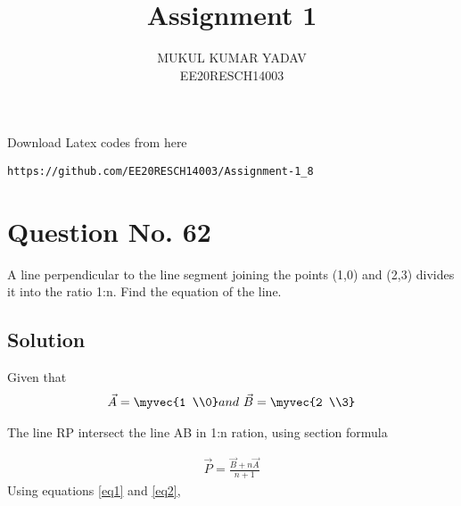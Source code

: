 \documentclass[journal,12pt,twocolumn]{IEEEtran}
\begin{document}
     \def\rightbox#1{\makebox[0in][r]{#1}}
     \def\centbox#1{\makebox[0in]{#1}}
     \def\topbox#1{\raisebox{-\baselineskip}[0in][0in]{#1}}
     \def\midbox#1{\raisebox{-0.5\baselineskip}[0in][0in]{#1}}
\vspace{3cm}
\title{Assignment 1}
\author{MUKUL KUMAR YADAV\\ EE20RESCH14003}
\maketitle
\newpage
\bigskip
\renewcommand{\thefigure}{\theenumi}
\renewcommand{\thetable}{\theenumi}
 Download Latex codes from here
\begin{lstlisting}
https://github.com/EE20RESCH14003/Assignment-1_8
\end{lstlisting}
%

%

%
\section{\textbf{Question No. 62}}
A line perpendicular to the line segment joining the points (1,0) and (2,3) divides it into the ratio 1:n. Find the equation of the line.

\subsection{\textbf{Solution}}

\begin{center}
    
\end{center} 
Given that
\begin{align}\label{eq1}
\vec{A}=\myvec{1 \\0}   and \ \vec{B}= \myvec{2 \\3}
\end{align}

The line RP intersect the line AB in 1:n ration, using section formula


\begin{align}\label{eq2}
\vec{P}=\frac{\vec{B}+n\vec{A}}{n+1}  
\end{align}
Using equations \eqref{eq1} and \eqref{eq2}, 
\end{document}
